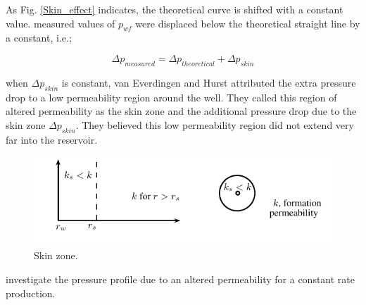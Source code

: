 \documentclass{llncs}
\numberwithin{equation}{section}
\numberwithin{figure}{section}
\numberwithin{table}{section}
\begin{document}
    As Fig. \ref{Skin_effect} indicates, the theoretical curve is shifted with a constant value.  measured values of $p_{wf}$ were displaced below the theoretical straight line by a constant, i.e.;
    
    \begin{equation}
    \Delta {{p}_{measured}}=\Delta {{p}_{theoretical}}+\Delta {{p}_{skin}}
        \label{Skin}
    \end{equation}    
    
    when $\Delta {{p}_{skin}}$ is constant, van Everdingen and Hurst attributed the extra pressure drop to a low permeability region around the well. They called this region of altered permeability as the skin zone and  the additional pressure drop due to the skin zone $\Delta {{p}_{skin}}$. They believed this low permeability region did not extend very far into the reservoir.
    
    \begin{figure}
        \begin{center}
        \includegraphics[scale=1.2]{Skin_1.pdf}
        \end{center}
        \caption{Skin zone.}
        \label{Skin_1}
    \end{figure}     
    
     investigate the pressure profile due to an altered permeability for a constant rate production.
    
\end{document}
